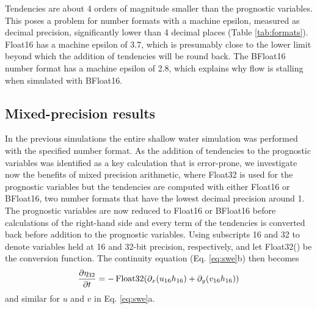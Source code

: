 Tendencies are about 4 orders of magnitude smaller than the prognostic variables.
This poses a problem for number formats with a machine epsilon, measured as decimal
precision, significantly lower than 4 decimal places (Table \ref{tab:formats}).
Float16 has a machine epsilon of 3.7, which is presumably close to the lower limit
beyond which the addition of tendencies will be round back. The BFloat16 number
format has a machine epsilon of 2.8, which explains why flow is stalling when
simulated with BFloat16.

\subsection{Mixed-precision results}
\label{sec:swm_results_mixed}

In the previous simulations the entire shallow water simulation was performed
with the specified number format. As the addition of tendencies to the prognostic
variables was identified as a key calculation that is error-prone, we investigate
now the benefits of mixed precision arithmetic, where Float32 is used for the
prognostic variables but the tendencies are computed with either Float16 or
BFloat16, two number formats that have the lowest decimal precision around 1.
The prognostic variables are now reduced to Float16 or BFloat16 before calculations
of the right-hand side and every term of the tendencies is converted back before
addition to the prognostic variables. Using subscripts 16 and 32 to denote variables
held at 16 and 32-bit precision, respectively, and let Float32() be the conversion
function. The continuity equation (Eq. \ref{eq:swe}b) then becomes
\begin{equation}
\frac{\partial \eta_{32}}{\partial t} = -\operatorname{Float32}( \partial_x(u_{16}h_{16})
+ \partial_y(v_{16}h_{16} ))
\label{eq:conversion}
\end{equation}
and similar for $u$ and $v$ in Eq. \ref{eq:swe}a.

